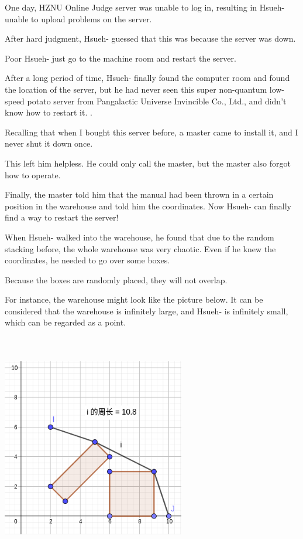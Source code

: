 One day, HZNU Online Judge server was unable to log in, resulting in Hsueh- unable to upload problems on the server.

After hard judgment, Hsueh- guessed that this was because the server was down.


Poor Hsueh- just go to the machine room and restart the server.

After a long period of time, Hsueh- finally found the computer room and found the location of the server, but he had never seen this super non-quantum low-speed potato server from Pangalactic Universe Invincible Co., Ltd., and didn't know how to restart it. .

Recalling that when I bought this server before, a master came to install it, and I never shut it down once.

This left him helpless. He could only call the master, but the master also forgot how to operate.

Finally, the master told him that the manual had been thrown in a certain position in the warehouse and told him the coordinates. Now Hsueh- can finally find a way to restart the server!

When Hsueh- walked into the warehouse, he found that due to the random stacking before, the whole warehouse was very chaotic. Even if he knew the coordinates, he needed to go over some boxes.

Because the boxes are randomly placed, they will not overlap.

For instance, the warehouse might look like the picture below. It can be considered that the warehouse is infinitely large, and Hsueh- is infinitely small, which can be regarded as a point.

\begin{center}
\includegraphics[width=8cm,height=10cm,natwidth=320,natheight=360]{data1.png} %
\end{center}


